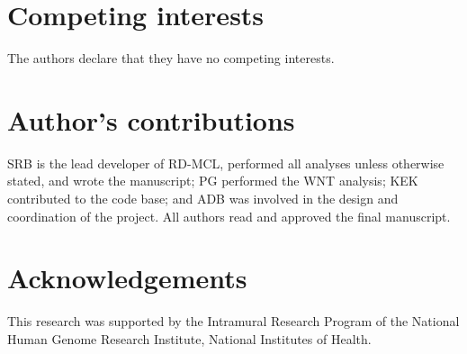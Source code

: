 \documentclass[twocolumn]{bmcart}%
\begin{document}
\begin{backmatter}

\section*{Competing interests}
  The authors declare that they have no competing interests.

\section*{Author's contributions}
  SRB is the lead developer of RD-MCL, performed all analyses unless otherwise stated, and wrote the manuscript;
  PG performed the WNT analysis;
  KEK contributed to the code base;
  and ADB was involved in the design and coordination of the project.
  All authors read and approved the final manuscript.

\section*{Acknowledgements}
  This research was supported by the Intramural Research Program of the National Human Genome Research Institute, National Institutes of Health.





\end{backmatter}
\end{document}

